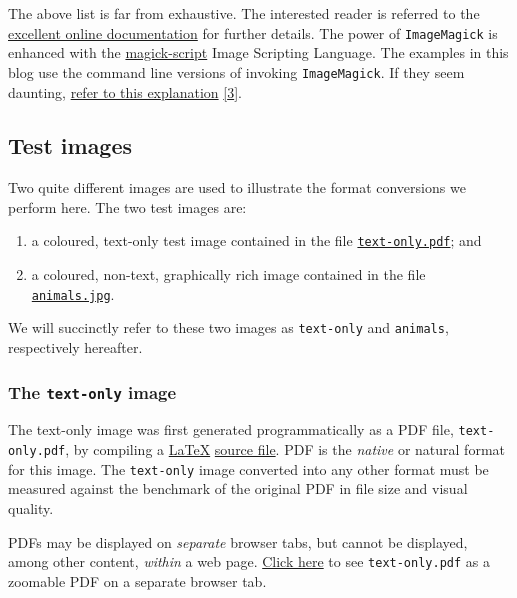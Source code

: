 \documentclass[
  12pt,
  british,
  a4paper,
  rgb,
  dvipsnames,
  svgnames,
  hyphens]{article}
\providecommand{\tightlist}{%
  \setlength{\itemsep}{0pt}\setlength{\parskip}{0pt}}
\begin{document}
The above list is far from exhaustive. The interested reader is referred
to the
\href{https://imagemagick.org/script/command-line-tools.php}{excellent
online documentation} for further details. The power of
\texttt{ImageMagick} is enhanced with the
\href{https://imagemagick.org/script/magick-script.php}{magick-script}
Image Scripting Language. The examples in this blog use the command line
versions of invoking \texttt{ImageMagick}. If they seem daunting,
\href{https://imagemagick.org/script/command-line-processing.php}{refer
to this explanation} \protect\hyperlink{ref-imcli}{{[}3{]}}.

\hypertarget{test-images}{%
\subsection{Test images}\label{test-images}}

Two quite different images are used to illustrate the format conversions
we perform here. The two test images are:

\begin{enumerate}
\tightlist
\item
  a coloured, text-only test image contained in the file
  \href{images/text-only.pdf}{\texttt{text-only.pdf}}; and
\item
  a coloured, non-text, graphically rich image contained in the file
  \href{images/animals.jpg}{\texttt{animals.jpg}}.
\end{enumerate}

We will succinctly refer to these two images as \texttt{text-only} and
\texttt{animals}, respectively hereafter.

\hypertarget{the-text-only-image}{%
\subsubsection{\texorpdfstring{The \texttt{text-only}
image}{The text-only image}}\label{the-text-only-image}}

The text-only image was first generated programmatically as a PDF file,
\texttt{text-only.pdf}, by compiling a
\href{https://www.latex-project.org/}{LaTeX}
\href{auxiliary/text-only.tex}{source file}. PDF is the \emph{native} or
natural format for this image. The \texttt{text-only} image converted
into any other format must be measured against the benchmark of the
original PDF in file size and visual quality.

PDFs may be displayed on \emph{separate} browser tabs, but cannot be
displayed, among other content, \emph{within} a web page.
\href{images/text-only.pdf}{Click here} to see \texttt{text-only.pdf} as
a zoomable PDF on a separate browser tab.
\end{document}
